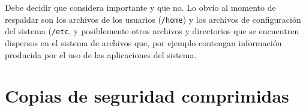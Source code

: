 \documentclass[12pt]{article}
\begin{document}
Debe decidir que considera importante y que no.  Lo obvio al momento de 
respaldar son los archivos de los usuarios (\texttt{/home}) y los archivos
de configuración del sistema (\texttt{/etc}, y posiblemente otros archivos
y directorios que se encuentren dispersos en el sistema de archivos que, 
por ejemplo contengan información producida por el uso de las aplicaciones
del sistema.

\section{Copias de seguridad comprimidas}

%	
%	
%
%	
%	
%
%	
%	
%
\end{document}
